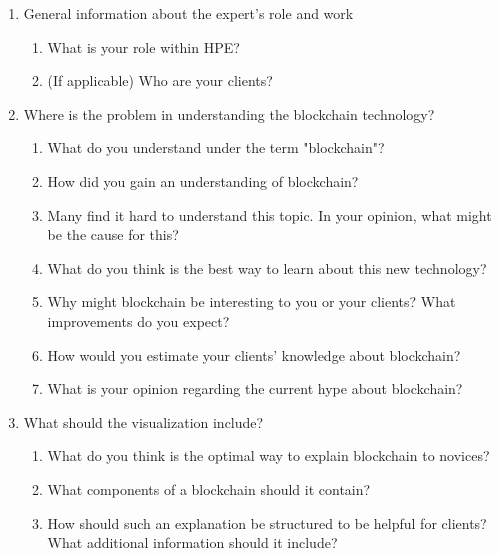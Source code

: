 \begin{enumerate}
    \item General information about the expert's role and work
    \begin{enumerate}
        \item What is your role within HPE?
        \item (If applicable) Who are your clients? 
    \end{enumerate}
    \item Where is the problem in understanding the blockchain technology?
    \begin{enumerate}
        \item What do you understand under the term "blockchain"?
        \item How did you gain an understanding of blockchain?
        \item Many find it hard to understand this topic. In your opinion, what might be the cause for this?
        \item What do you think is the best way to learn about this new technology?
        \item Why might blockchain be interesting to you or your clients? What improvements do you expect?
        \item How would you estimate your clients' knowledge about blockchain?
        \item What is your opinion regarding the current hype about blockchain?
    \end{enumerate}
    \item What should the visualization include?
    \begin{enumerate}
        \item What do you think is the optimal way to explain blockchain to novices?
        \item What components of a blockchain should it contain?
        \item How should such an explanation be structured to be helpful for clients? What additional information should it include?
    \end{enumerate}
\end{enumerate}



